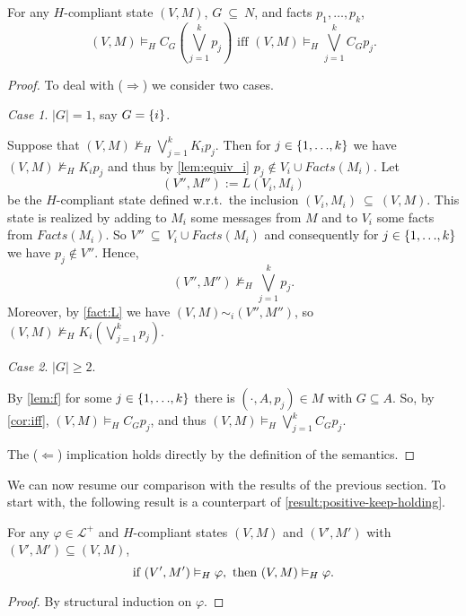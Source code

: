 \documentclass{article}
\newcounter{#1}
\newcommand{\sse}{\mbox{$\:\subseteq\:$}}
\newcommand{\LL}{\mbox{$\ldots$}}
\newcommand{\NI}{\noindent}
\newcommand{\II}{\vspace{2 mm}}
\newcommand{\state}[1][]{\ensuremath{(V#1,M#1)}\xspace}
\newcommand{\msg}[3]{\ensuremath{(#1,#2,#3)}\xspace}
\newcommand{\knows}[1]{\ensuremath{K_{#1}}\xspace}
\newcommand{\ck}[1]{\ensuremath{C_{#1}}\xspace}\newcommand{\Facts}{\mathit{Facts}}
\begin{document}
\begin{lemma}
\label{lem:properties}
For any $H$-compliant state $\state$, $G \sse N$,
and facts $p_1, \LL, p_k$,
  \[
  \mbox{$\state \vDash_H \ck G(\bigvee_{j=1}^{k} p_j)$ iff $\state \vDash_H \bigvee_{j=1}^{k} \ck G p_j$.}
  \]
\end{lemma}
\begin{proof}
To deal with ($\Rightarrow$) we consider two cases.
\II

\NI
\emph{Case 1}. $|G| = 1$, say $G = \mbox{$\{{i}\}$}$.

Suppose that $\state\nvDash_H \bigvee_{j=1}^{k} \knows i p_j$.
Then for $j \in \C{1, \LL, k}$ we have $\state\nvDash_H \knows i p_j$
and thus by
\cref{lem:equiv_i} $p_j \not\in V_i \cup \Facts(M_i)$.
Let
\[
\state[''] := L(V_i, M_i)
\]
be the $H$-compliant state defined w.r.t.~the inclusion $(V_i, M_i) \sse \state$.
This state is realized by adding to $M_i$ some messages from $M$ and to $V_i$ some
facts from $\Facts(M_i)$. So $V'' \sse V_i \cup \Facts(M_i)$ and consequently
for $j \in \C{1, \LL, k}$ we have $p_j \not\in V''$. Hence, 
\[
    \state['']\nvDash_H \textstyle\bigvee_{j=1}^{k} p_j.
\]
Moreover, by \cref{fact:L} we have $\state\sim_i \state['']$, so
$\state\nvDash_H \knows i(\bigvee_{j=1}^{k} p_j)$. 
\II

\NI
\emph{Case 2}. $|G| \geq 2$.

By \cref{lem:f} for some $j \in \C{1, \LL, k}$ there is $\msg{\cdot}{A}{p_j}\in M$ with $G \subseteq A$.
So, by \cref{cor:iff}, $\state\vDash_H \ck G p_j$, and thus $\state \vDash_H \bigvee_{j=1}^{k} \ck G p_j$.
\II

The ($\Leftarrow$) implication holds directly by the definition of the semantics.
\end{proof}

We can now resume our comparison with the results of the previous section. To start with, 
the following result is a counterpart of \cref{result:positive-keep-holding}.



\begin{lemma}
  \label{lem:mono}
  For any $\varphi\in\mathcal{L}^+$ and $H$-compliant states $(V,M)$ and $(V',M')$
  with $(V',M')\subseteq\state $,
\[
    \textup{if } (V', M')\vDash_H\varphi, \textup{ then } \state \vDash_H\varphi.
\]
\end{lemma}

\begin{proof} By structural induction on $\varphi$.
\end{proof}
\end{document}
